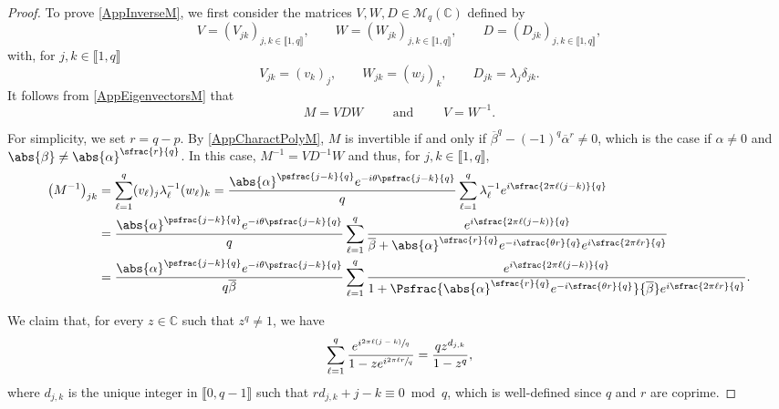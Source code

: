 \begin{proof}
To prove \eqref{AppInverseM}, we first consider the matrices $V, W, D \in \mathcal M_{q}(\mathbb C)$ defined by
\[
V = (V_{jk})_{j, k \in \llbracket 1, q\rrbracket}, \qquad W = (W_{jk})_{j, k \in \llbracket 1, q\rrbracket}, \qquad D = (D_{jk})_{j, k \in \llbracket 1, q\rrbracket},
\]
with, for $j, k \in \llbracket 1, q\rrbracket$
\[
V_{jk} = (v_k)_j, \qquad W_{jk} = (w_j)_k, \qquad D_{jk} = \lambda_j \delta_{jk}.
\]
It follows from \eqref{AppEigenvectorsM} that
\[
M = V D W \qquad \text{ and } \qquad V = W^{-1}.
\]

For simplicity, we set $r\!=\!q - p$. By \eqref{AppCharactPolyM}, $M$ is invertible if and only if \hbox{$\overline\beta^q\!-\!(-1)^q \overline\alpha^r\!\neq\!0$}, which is the case if $\alpha \neq 0$ and $\abs{\beta} \neq \abs{\alpha}^{\sfrac{r}{q}}$. In this case, $M^{-1} = V D^{-1} W$ and thus, for $j, k \in \llbracket 1, q\rrbracket$,
\begin{equation}
\label{DevelopMMinus1}
\begin{aligned}
\left(M^{-1}\right)_{jk} & = \sum_{\ell=1}^q (v_\ell)_j \lambda_\ell^{-1} (w_\ell)_k = \frac{\abs{\alpha}^{\psfrac{j-k}{q}} e^{-i\theta\psfrac{j-k}{q}}}{q} \sum_{\ell=1}^q \lambda_\ell^{-1} e^{i \sfrac{2\pi \ell (j - k)}{q}}\\
& = \frac{\abs{\alpha}^{\psfrac{j-k}{q}} e^{-i\theta\psfrac{j-k}{q}}}{q} \sum_{\ell=1}^q \frac{e^{i \sfrac{2\pi \ell (j - k)}{q}}}{\overline\beta + \abs{\alpha}^{\sfrac{r}{q}} e^{-i\sfrac{\theta r}{q}} e^{i \sfrac{2\pi \ell r}{q}}}\\
&= \frac{\abs{\alpha}^{\psfrac{j-k}{q}} e^{-i\theta\psfrac{j-k}{q}}}{q \overline\beta} \sum_{\ell=1}^q \frac{e^{i \sfrac{2\pi \ell (j - k)}{q}}}{1 + \Psfrac{\abs{\alpha}^{\sfrac{r}{q}} e^{-i\sfrac{\theta r}{q}}}{\overline\beta} e^{i \sfrac{2\pi \ell r}{q}}}.
\end{aligned}
\end{equation}

We claim that, for every $z \in \mathbb C$ such that $z^q \neq 1$, we have
\begin{equation}
\label{CalculSommeMeromorphe}
\sum_{\ell=1}^q \frac{e^{i \sfrac{2\pi \ell (j - k)}{q}}}{1 - z e^{i \sfrac{2 \pi \ell r}{q}}} = \frac{q z^{d_{j, k}}}{1 - z^q},
\end{equation}
where $d_{j, k}$ is the unique integer in $\llbracket 0, q-1\rrbracket$ such that $r d_{j, k} + j - k \equiv 0 \bmod q$, which is well-defined since $q$ and $r$ are coprime.


\end{proof}

